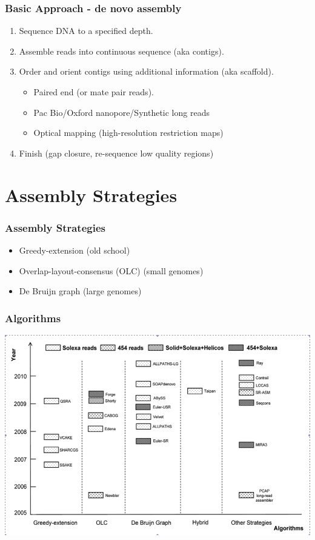 \documentclass[pdf]{beamer}
\begin{document}
\begin{frame}
\frametitle{Basic Approach - de novo assembly}
\begin{enumerate}
\item Sequence DNA to a specified depth.
\item Assemble reads into continuous sequence (aka contigs).
\item Order and orient contigs using additional information (aka scaffold).
\begin{itemize}
\item Paired end (or mate pair reads).
\item Pac Bio/Oxford nanopore/Synthetic long reads
\item Optical mapping (high-resolution restriction maps)
\end{itemize}
\item Finish (gap closure, re-sequence low quality regions)
\end{enumerate}
\end{frame}

%
\section{Assembly Strategies}
\begin{frame}
\frametitle{Assembly Strategies}
\begin{itemize}
\item Greedy-extension (old school)
\item Overlap-layout-consensus (OLC) (small genomes)
\item De Bruijn graph (large genomes)
\end{itemize}
\end{frame}


\begin{frame}
\frametitle{Algorithms}
\begin{center}
\includegraphics[scale=.32]{Figures/algorithms.png} 
\end{center}
\end{frame}
\end{document}
